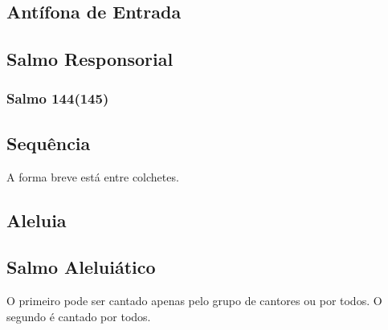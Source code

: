 \subsection{Antífona de Entrada}\label{subsection:tempus-per-annum/sanctissimi-corporis-et-sanguinis-christi/introitus}

\AllowPageFlush

\subsection[Salmo Responsorial]{Salmo Responsorial}\label{subsection:tempus-per-annum/sanctissimi-corporis-et-sanguinis-christi/psalmus-responsorius}
\subsubsection{Salmo 144(145)}

\subsection{Sequência}\label{subsection:tempus-per-annum/sanctissimi-corporis-et-sanguinis-christi/sequentia}
\begin{rubrica}
  A forma breve está entre colchetes.
\end{rubrica}

\subsection{Aleluia}\label{subsection:tempus-per-annum/sanctissimi-corporis-et-sanguinis-christi/alleluia}

\AllowPageFlush

\subsection[Salmo Aleluiático]{Salmo Aleluiático}\label{subsection:tempus-per-annum/sanctissimi-corporis-et-sanguinis-christi/psalmus-alleluiaticus}
\begin{rubrica}
  O primeiro {\normalfont\Rbar} pode ser cantado apenas pelo grupo de cantores ou por todos. O segundo {\normalfont\Rbar} é cantado por todos.
\end{rubrica}

